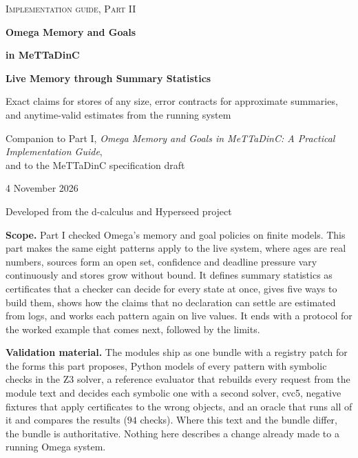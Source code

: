 \documentclass[11pt]{article}
\theoremstyle{definition}
\theoremstyle{plain}
\newcommand{\nchecks}{94}
\begin{document}
\hypersetup{pageanchor=false}
\begin{titlepage}
\thispagestyle{empty}
\vspace*{2.2cm}
{\color{dcblue}\large\scshape Implementation guide, Part II\par}
\vspace{1.4cm}
{\color{dcblue}\fontsize{28}{34}\selectfont\bfseries Omega Memory and Goals\par}
\vspace{0.3cm}
{\color{dcblue}\fontsize{28}{34}\selectfont\bfseries in MeTTaDinC\par}
\vspace{0.7cm}
{\LARGE\bfseries Live Memory through Summary Statistics\par}
\vspace{0.7cm}
{\large Exact claims for stores of any size, error contracts for approximate summaries,\\ and
anytime-valid estimates from the running system\par}
\vspace{1.6cm}
{\large Companion to Part I, \emph{Omega Memory and Goals in MeTTaDinC: A Practical Implementation
Guide},\\ and to the MeTTaDinC specification draft\par}
\vspace{0.4cm}
{4 November 2026\par}
\vspace{0.8cm}
{Developed from the d-calculus and Hyperseed project\par}
\vfill
\noindent\begin{minipage}{\textwidth}
\small
{\color{dcblue}\bfseries Scope.} Part I checked Omega's memory and goal policies on finite models.
This part makes the same eight patterns apply to the live system, where ages are real numbers,
sources form an open set, confidence and deadline pressure vary continuously and stores grow
without bound. It defines summary statistics as certificates that a checker can decide for every
state at once, gives five ways to build them, shows how the claims that no declaration can settle
are estimated from logs, and works each pattern again on live values. It ends with a protocol for
the worked example that comes next, followed by the limits.

\smallskip
{\color{dcblue}\bfseries Validation material.} The modules ship as one bundle with a registry patch
for the forms this part proposes, Python models of every pattern with symbolic checks in the Z3
solver, a reference evaluator that rebuilds every request from the module text and decides each
symbolic one with a second solver, cvc5, negative fixtures that apply certificates to the wrong
objects, and an oracle that runs all of it and compares the results ($\nchecks$ checks). Where
this text and the bundle differ, the bundle is authoritative. Nothing here describes a change
already made to a running Omega system.
\end{minipage}
\end{titlepage}
\hypersetup{pageanchor=true}
\end{document}
